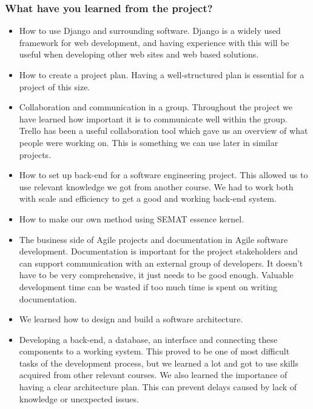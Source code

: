 \subsubsection{What have you learned from the project?}
\begin{itemize}
    \item How to use Django and surrounding software. Django is a widely used framework for web development, and having experience with this will be useful when developing other web sites and web based solutions.
    \item How to create a project plan. Having a well-structured plan is essential for a project of this size.   
    \item Collaboration and communication in a group. Throughout the project we have learned how important it is to communicate well within the group. Trello has been a useful collaboration tool which gave us an overview of what people were working on. This is something we can use later in similar projects.
    \item How to set up back-end for a software engineering project. This allowed us to use relevant knowledge we got from another course. We had to work both with scale and efficiency to get a good and working back-end system.
    \item How to make our own method using SEMAT essence kernel.
    \item The business side of Agile projects and documentation in Agile software development. Documentation is important for the project stakeholders and can support communication with an external group of developers. It doesn't have to be very comprehensive, it just needs to be good enough. Valuable development time can be wasted if too much time is spent on writing documentation.
    \item We learned how to design and build a software architecture. 
    \item Developing a back-end, a database, an interface and connecting these components to a working system. This proved to be one of most difficult tasks of the development process, but we learned a lot and got to use skills acquired from other relevant courses. We also learned the importance of having a clear architecture plan. This can prevent delays caused by lack of knowledge or unexpected issues.
\end{itemize}

